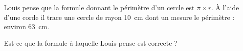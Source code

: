 

\begin{rituel}
    Louis pense que la formule donnant le périmètre d'un cercle est \( \pi\times r\). À l'aide d'une corde il trace une cercle de rayon \SI{10}{\centi\meter} dont un mesure le périmètre : environ \SI{63}{\centi\meter}.

    Est-ce que la formule à laquelle Louis pense est correcte ?
\end{rituel}
